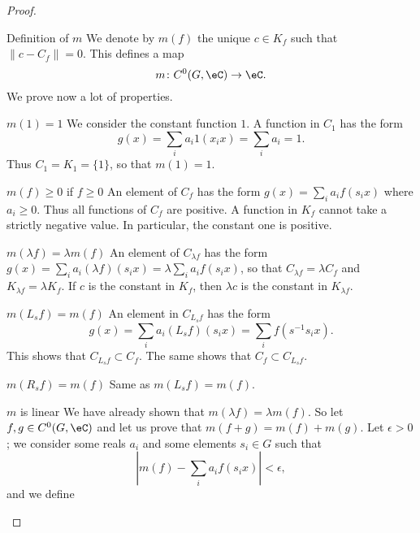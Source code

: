 \begin{proof}
\begin{subproof}
    \item[Definition of \( m\)]
        We denote by \( m(f)\) the unique \( c\in K_f\) such that \( \| c-C_f \|=0\). This defines a map
        \begin{equation}
            m\colon C^0(G,\eC)\to \eC.
        \end{equation}
        We prove now a lot of properties.
    \item[\( m(1)=1\)]
        We consider the constant function \( 1\). A function in \( C_1\) has the form
        \begin{equation}
            g(x)=\sum_ia_i1(x_ix)=\sum_ia_i=1.
        \end{equation}
        Thus \( C_1=K_1=\{ 1 \}\), so that \( m(1)=1\).
    \item[\( m(f)\geq 0\) if \( f\geq 0\)]
            An element of \( C_f\) has the form \( g(x)=\sum_ia_if(s_ix)\) where \( a_i\geq 0\). Thus all functions of \( C_f\) are positive. A function in \( K_f\) cannot take a strictly negative value. In particular, the constant one is positive.
        \item[\( m(\lambda f)=\lambda m(f)\)]
            An element of \( C_{\lambda f}\) has the form \( g(x)=\sum_ia_i(\lambda f)(s_ix)=\lambda\sum_ia_if(s_ix)\), so that \( C_{\lambda f}=\lambda C_f\) and \( K_{\lambda f}=\lambda K_f\). If \( c\) is the constant in \( K_f\), then \( \lambda c\) is the constant in \( K_{\lambda f}\).
        \item[\( m(L_sf)=m(f)\)]
            An element in \( C_{L_sf}\) has the form
            \begin{equation}
                g(x)=\sum_ia_i(L_sf)(s_ix)=\sum_if(s^{-1}s_ix).
            \end{equation}
            This shows that \( C_{L_sf}\subset C_f\). The same shows that \( C_f\subset C_{L_sf}\).
        \item[\( m(R_sf)=m(f)\)]
            Same as \( m(L_sf)=m(f)\).
        \item[\( m\) is linear]
            We have already shown that \( m(\lambda f)=\lambda m(f)\). So let \( f,g\in C^0(G,\eC)\) and let us prove that \( m(f+g)=m(f)+m(g)\). Let \( \epsilon>0\); we consider some reals \( a_i\) and some elements \( s_i\in G\) such that
            \begin{equation}        \label{EQooDDZXooWIPAhX}
                | m(f)-\sum_ia_if(s_ix) |<\epsilon,
            \end{equation}
            and we define
            \begin{equation}

\end{equation}
\end{subproof}
\end{proof}
